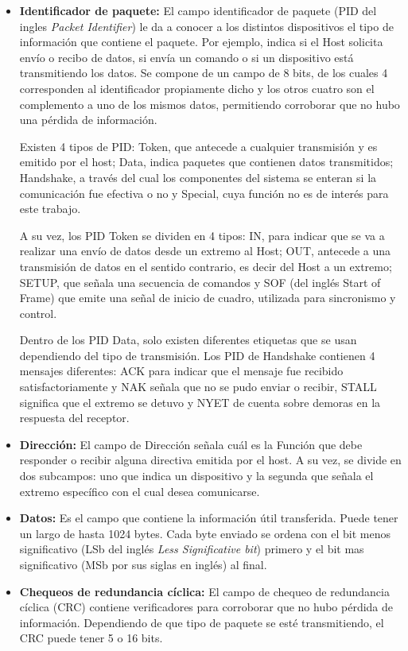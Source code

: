 	\begin{itemize}

	\item {\bf Identificador de paquete:}
		El campo identificador de paquete (PID del ingles {\it Packet Identifier}) le da a conocer a los distintos dispositivos el tipo de información que contiene el paquete. Por ejemplo, indica si el Host solicita envío o recibo de datos, si envía un comando o si un dispositivo está transmitiendo los datos. Se compone de un campo de 8 bits, de los cuales 4 corresponden al identificador propiamente dicho y los otros cuatro son el complemento a uno de los mismos datos, permitiendo corroborar que no hubo una pérdida de información.%
		
		Existen 4 tipos de PID: Token, que antecede a cualquier transmisión y es emitido por el host; Data, indica paquetes que contienen datos transmitidos; Handshake, a través del cual los componentes del sistema se enteran si la comunicación fue efectiva o no y Special, cuya función no es de interés para este trabajo.%
	
		A su vez, los PID Token se dividen en 4 tipos: IN, para indicar que se va a realizar una envío de datos desde un extremo al Host; OUT, antecede a una transmisión de datos en el sentido contrario, es decir del Host a un extremo; SETUP, que señala una secuencia de comandos y SOF (del inglés {Start of Frame)} que emite una señal de inicio de cuadro, utilizada para sincronismo y control.%
	
		Dentro de los PID Data, solo existen diferentes etiquetas que se usan dependiendo del tipo de transmisión. Los PID de Handshake contienen 4 mensajes diferentes: ACK para indicar que el mensaje fue recibido satisfactoriamente y NAK señala que no se pudo enviar o recibir, STALL significa que el extremo se detuvo y NYET de cuenta sobre demoras en la respuesta del receptor.
	
	\item{\bf Dirección:}
		El campo de Dirección señala cuál es la Función que debe responder o recibir alguna directiva emitida por el host. A su vez, se divide en dos subcampos: uno que indica un dispositivo y la segunda que señala el extremo específico con el cual desea comunicarse.

	\item{\bf Datos:}
		Es el campo que contiene la información útil transferida. Puede tener un largo de hasta 1024 bytes. Cada byte enviado se ordena con el bit menos significativo (LSb del inglés {\it Less Significative bit}) primero y el bit mas significativo (MSb por sus siglas en inglés) al final.

	\item{\bf Chequeos de redundancia cíclica:}
		El campo de chequeo de redundancia cíclica (CRC) contiene verificadores para corroborar que no hubo pérdida de información. Dependiendo de que tipo de paquete se esté transmitiendo, el CRC puede tener 5 o 16 bits. 
	\end{itemize}
